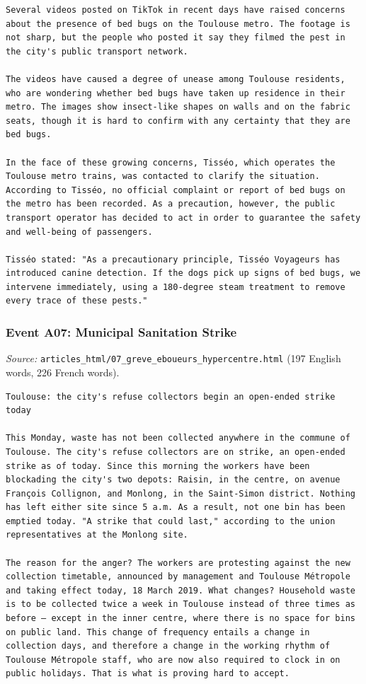 \begin{Verbatim}
Several videos posted on TikTok in recent days have raised concerns about the presence of bed bugs on the Toulouse metro. The footage is not sharp, but the people who posted it say they filmed the pest in the city's public transport network.

The videos have caused a degree of unease among Toulouse residents, who are wondering whether bed bugs have taken up residence in their metro. The images show insect-like shapes on walls and on the fabric seats, though it is hard to confirm with any certainty that they are bed bugs.

In the face of these growing concerns, Tisséo, which operates the Toulouse metro trains, was contacted to clarify the situation. According to Tisséo, no official complaint or report of bed bugs on the metro has been recorded. As a precaution, however, the public transport operator has decided to act in order to guarantee the safety and well-being of passengers.

Tisséo stated: "As a precautionary principle, Tisséo Voyageurs has introduced canine detection. If the dogs pick up signs of bed bugs, we intervene immediately, using a 180-degree steam treatment to remove every trace of these pests."
\end{Verbatim}

\subsubsection{Event A07: Municipal Sanitation Strike}
\emph{Source:} \texttt{articles\_html/07\_greve\_eboueurs\_hypercentre.html} (197 English words, 226 French words).

\begin{Verbatim}
Toulouse: the city's refuse collectors begin an open-ended strike today

This Monday, waste has not been collected anywhere in the commune of Toulouse. The city's refuse collectors are on strike, an open-ended strike as of today. Since this morning the workers have been blockading the city's two depots: Raisin, in the centre, on avenue François Collignon, and Monlong, in the Saint-Simon district. Nothing has left either site since 5 a.m. As a result, not one bin has been emptied today. "A strike that could last," according to the union representatives at the Monlong site.

The reason for the anger? The workers are protesting against the new collection timetable, announced by management and Toulouse Métropole and taking effect today, 18 March 2019. What changes? Household waste is to be collected twice a week in Toulouse instead of three times as before — except in the inner centre, where there is no space for bins on public land. This change of frequency entails a change in collection days, and therefore a change in the working rhythm of Toulouse Métropole staff, who are now also required to clock in on public holidays. That is what is proving hard to accept.
\end{Verbatim}


